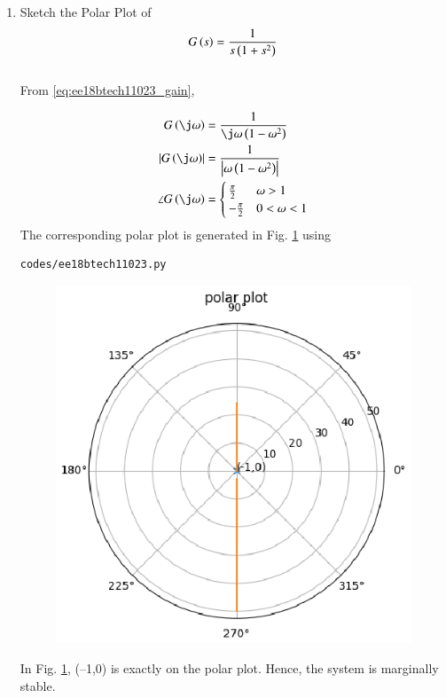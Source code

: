 \begin{enumerate}[label=\thesubsection.\arabic*.,ref=\thesubsection.\theenumi]
\item
Sketch the Polar Plot of
\begin{align}
G\left(s\right) = \frac{1}{s\left(1+s^{2}\right)}
\label{eq:ee18btech11023_gain}
\end{align}
\\
\solution  From \eqref{eq:ee18btech11023_gain},

\begin{align}
G\brak{\j\omega} &=   \frac{1}{\j\omega\brak{1-{\omega}^{2}}}
\\
      \abs{G\brak{\j\omega}} &= \frac{1}{\abs{\omega\brak{1-{\omega}^{2}}}}
\\
    \angle G\brak{\j\omega} &= 
\begin{cases}
\frac{\pi}{2} & \omega > 1
\\
-\frac{\pi}{2} & 0 < \omega < 1
\end{cases}
    \end{align}
%
The corresponding polar plot is generated in Fig.   \ref{fig:ee18btech11023} using 
\begin{lstlisting}
codes/ee18btech11023.py
\end{lstlisting}

\begin{figure}[!ht]
\centering
  \includegraphics[width=\columnwidth]{./figs/ee18btech11023/ee18btech11023_1c.eps}
  \caption{}
  \label{fig:ee18btech11023}
\end{figure}
In Fig.   \ref{fig:ee18btech11023},  (–1,0) is exactly on the polar plot.  Hence, the system is marginally stable.


\end{enumerate}
